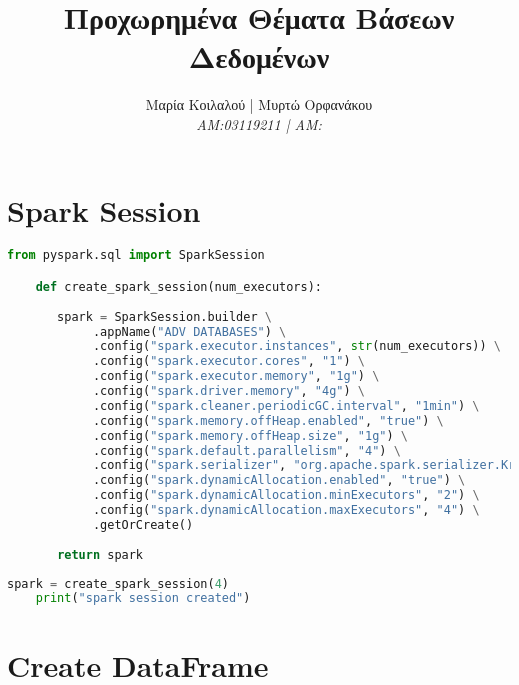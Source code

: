 \documentclass{article}
\title{Προχωρημένα Θέματα Βάσεων Δεδομένων}
\author{Μαρία Κοιλαλού | Μυρτώ Ορφανάκου\\
\textit{AM:03119211 | ΑM:}}
\begin{document}
\maketitle

\vspace{3\baselineskip}

\section*{Spark Session}

\begin{lstlisting}[language = Python]
    from pyspark.sql import SparkSession

    def create_spark_session(num_executors):
       
       spark = SparkSession.builder \
            .appName("ADV DATABASES") \
            .config("spark.executor.instances", str(num_executors)) \
            .config("spark.executor.cores", "1") \
            .config("spark.executor.memory", "1g") \
            .config("spark.driver.memory", "4g") \
            .config("spark.cleaner.periodicGC.interval", "1min") \
            .config("spark.memory.offHeap.enabled", "true") \
            .config("spark.memory.offHeap.size", "1g") \
            .config("spark.default.parallelism", "4") \
            .config("spark.serializer", "org.apache.spark.serializer.KryoSerializer") \
            .config("spark.dynamicAllocation.enabled", "true") \
            .config("spark.dynamicAllocation.minExecutors", "2") \
            .config("spark.dynamicAllocation.maxExecutors", "4") \
            .getOrCreate()
          
       return spark
\end{lstlisting}

\begin{lstlisting}[language = Python]
    spark = create_spark_session(4)
    print("spark session created")  
\end{lstlisting}
\section*{Create DataFrame}
\end{document}
